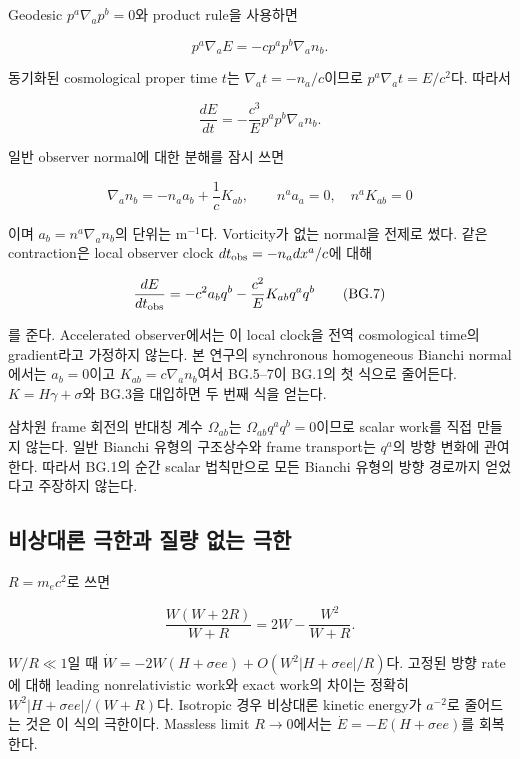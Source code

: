 Geodesic \(p^a\nabla_ap^b=0\)와 product rule을 사용하면

\[p^a\nabla_aE=-c p^ap^b\nabla_an_b.\tag{BG.4}\]

동기화된 cosmological proper time \(t\)는 \(\nabla_at=-n_a/c\)이므로 \(p^a\nabla_at=E/c^2\)다. 따라서

\[\frac{dE}{dt}=-\frac{c^3}{E}p^ap^b\nabla_an_b.\tag{BG.5}\]

일반 observer normal에 대한 분해를 잠시 쓰면

\[\nabla_an_b=-n_a a_b+\frac1cK_{ab},\qquad n^aa_a=0,\quad n^aK_{ab}=0\tag{BG.6}\]

이며 \(a_b=n^a\nabla_an_b\)의 단위는 m\(^{-1}\)다. Vorticity가 없는 normal을 전제로 썼다. 같은 contraction은 local observer clock \(dt_{\rm obs}=-n_a dx^a/c\)에 대해

\[\frac{dE}{dt_{\rm obs}}=-c^2 a_bq^b-\frac{c^2}{E}K_{ab}q^aq^b\tag{BG.7}\]

를 준다. Accelerated observer에서는 이 local clock을 전역 cosmological time의 gradient라고 가정하지 않는다. 본 연구의 synchronous homogeneous Bianchi normal에서는 \(a_b=0\)이고 \(K_{ab}=c\nabla_an_b\)여서 BG.5--7이 BG.1의 첫 식으로 줄어든다. \(K=H\gamma+\sigma\)와 BG.3을 대입하면 두 번째 식을 얻는다.

삼차원 frame 회전의 반대칭 계수 \(\Omega_{ab}\)는 \(\Omega_{ab}q^aq^b=0\)이므로 scalar work를 직접 만들지 않는다. 일반 Bianchi 유형의 구조상수와 frame transport는 \(q^a\)의 방향 변화에 관여한다. 따라서 BG.1의 순간 scalar 법칙만으로 모든 Bianchi 유형의 방향 경로까지 얻었다고 주장하지 않는다.

\hypertarget{uxbe44uxc0c1uxb300uxb860-uxadf9uxd55cuxacfc-uxc9c8uxb7c9-uxc5c6uxb294-uxadf9uxd55c}{%
\subsection{비상대론 극한과 질량 없는 극한}\label{uxbe44uxc0c1uxb300uxb860-uxadf9uxd55cuxacfc-uxc9c8uxb7c9-uxc5c6uxb294-uxadf9uxd55c}}

\(R=m_ec^2\)로 쓰면

\[\frac{W(W+2R)}{W+R}=2W-\frac{W^2}{W+R}.\tag{BG.8}\]

\(W/R\ll1\)일 때 \(\dot W=-2W(H+\sigma ee)+O(W^2|H+\sigma ee|/R)\)다. 고정된 방향 rate에 대해 leading nonrelativistic work와 exact work의 차이는 정확히 \(W^2|H+\sigma ee|/(W+R)\)다. Isotropic 경우 비상대론 kinetic energy가 \(a^{-2}\)로 줄어드는 것은 이 식의 극한이다. Massless limit \(R\to0\)에서는 \(\dot E=-E(H+\sigma ee)\)를 회복한다.

